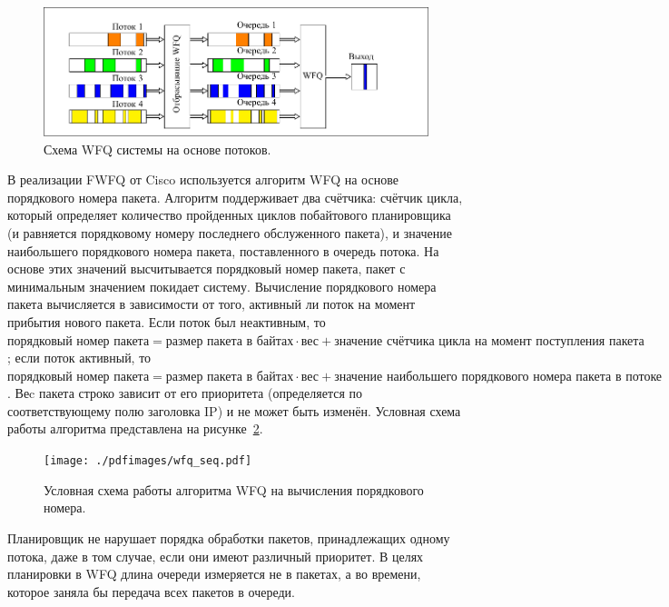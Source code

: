     \begin{figure}[ht!]
		\center
        \includegraphics[scale=1.3]{./pdfimages/fwfq.pdf}
        \caption{Схема WFQ системы на основе потоков.}
		\label{pic:fwfqscheme}
    \end{figure}

	В реализации FWFQ от Cisco используется алгоритм WFQ на основе порядкового номера
	пакета. Алгоритм поддерживает два счётчика: счётчик цикла, который 
	определяет количество пройденных циклов побайтового планировщика (и равняется
	порядковому номеру последнего обслуженного пакета), и значение
	наибольшего порядкового номера пакета, поставленного в очередь потока.
	На основе этих значений высчитывается порядковый номер пакета, пакет
	с минимальным значением покидает систему. Вычисление порядкового номера пакета
	вычисляется в зависимости от того, активный ли поток на момент прибытия нового пакета.
	Если поток был неактивным, то $\textit{порядковый номер пакета} = \textit{размер пакета в байтах} \cdot \textit{вес}
	+ \textit{значение счётчика цикла на момент поступления пакета}$; если поток активный,
	то $\textit{порядковый номер пакета} = \textit{размер пакета в байтах} \cdot \textit{вес}
	+ \textit{значение наибольшего порядкового номера пакета в потоке}$.
	Веc пакета строко зависит от его приоритета (определяется по соответствующему полю заголовка IP)
	и не может быть изменён.\cite{Vagesna} Условная схема работы алгоритма представлена на
	рисунке~\ref{pic:wfqseq}.

    \begin{figure}[ht!]
		\center
        \texttt{[image: ./pdfimages/wfq\_seq.pdf]}
        \caption{Условная схема работы алгоритма WFQ на вычисления порядкового номера.}
		\label{pic:wfqseq}
    \end{figure}

    Планировщик не нарушает порядка обработки пакетов, принадлежащих одному
    потока, даже в том случае, если они имеют различный приоритет.
    В целях планировки в WFQ длина очереди измеряется не в пакетах, а во времени,
    которое заняла бы передача всех пакетов в очереди.\cite{Vagesna}

